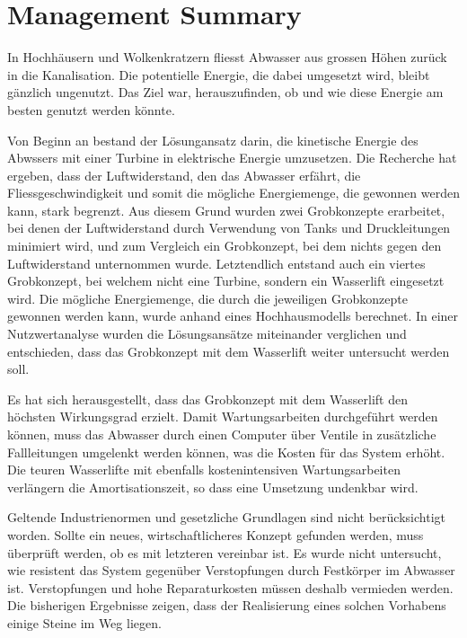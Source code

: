 \section*{Management Summary}
\par In Hochhäusern und Wolkenkratzern fliesst Abwasser aus grossen Höhen zurück in die Kanalisation. Die potentielle Energie, die dabei umgesetzt wird, bleibt gänzlich ungenutzt. Das Ziel war, herauszufinden, ob und wie diese Energie am besten genutzt werden könnte.\smallskip
\par Von Beginn an bestand der Lösungansatz darin, die kinetische Energie des Abwssers mit einer Turbine in elektrische Energie umzusetzen. Die Recherche hat ergeben, dass der Luftwiderstand, den das Abwasser erfährt, die Fliessgeschwindigkeit und somit die mögliche Energiemenge, die gewonnen werden kann, stark begrenzt. Aus diesem Grund wurden zwei Grobkonzepte erarbeitet, bei denen der Luftwiderstand durch Verwendung von Tanks und Druckleitungen minimiert wird, und zum Vergleich ein Grobkonzept, bei dem nichts gegen den Luftwiderstand unternommen wurde. Letztendlich entstand auch ein viertes Grobkonzept, bei welchem nicht eine Turbine, sondern ein Wasserlift eingesetzt wird. Die mögliche Energiemenge, die durch die jeweiligen Grobkonzepte gewonnen werden kann, wurde anhand eines Hochhausmodells berechnet. In einer Nutzwertanalyse wurden die Lösungsansätze miteinander verglichen und entschieden, dass das Grobkonzept mit dem Wasserlift weiter untersucht werden soll.\smallskip
\par Es hat sich herausgestellt, dass das Grobkonzept mit dem Wasserlift den höchsten Wirkungsgrad erzielt. Damit Wartungsarbeiten durchgeführt werden können, muss das Abwasser durch einen Computer über Ventile in zusätzliche Fallleitungen umgelenkt werden können, was die Kosten für das System erhöht. Die teuren Wasserlifte mit ebenfalls kostenintensiven Wartungsarbeiten verlängern die Amortisationszeit, so dass eine Umsetzung undenkbar wird.\smallskip
\par Geltende Industrienormen und gesetzliche Grundlagen sind nicht berücksichtigt worden. Sollte ein neues, wirtschaftlicheres Konzept gefunden werden, muss überprüft werden, ob es mit letzteren vereinbar ist. Es wurde nicht untersucht, wie resistent das System gegenüber Verstopfungen durch Festkörper im Abwasser ist. Verstopfungen und hohe Reparaturkosten müssen deshalb vermieden werden. Die bisherigen Ergebnisse zeigen, dass der Realisierung eines solchen Vorhabens einige Steine im Weg liegen.\smallskip